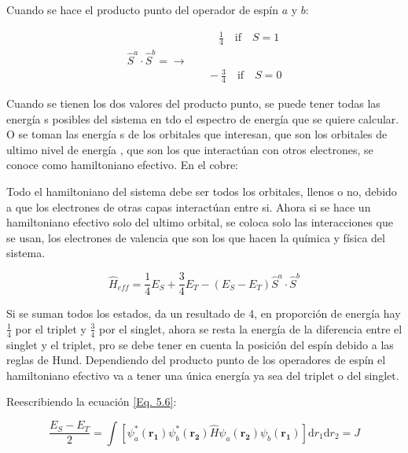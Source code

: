 \documentclass[11pt,fleqn]{book}
\renewcommand{\vec}[1]{\mathbf{#1}}
\begin{document}
Cuando se hace el producto punto del operador de espín $a$ y $b$:

\begin{equation*}
\begin{split}
    &\qquad\frac{1}{4}\quad\text{if}\quad S=1\\
    \hat{S}^{a}\cdot\hat{S}^{b}=\longrightarrow&\\
    &\quad-\frac{3}{4}\quad\text{if}\quad S=0
\end{split}
\end{equation*}

Cuando se tienen los dos valores del producto punto, se puede tener todas las energía s posibles del sistema en tdo el espectro de energía  que se quiere calcular. O se toman las energía s de los orbitales que interesan, que son los orbitales de ultimo nivel de energía , que son los que interactúan con otros electrones, se conoce como hamiltoniano efectivo. En el cobre:


Todo el hamiltoniano del sistema debe ser todos los orbitales, llenos o no, debido a que los electrones de otras capas interactúan entre si. Ahora si se hace un hamiltoniano efectivo solo del ultimo orbital, se coloca solo las interacciones que se usan, los electrones de valencia que son los que hacen la química y física del sistema. 

\begin{equation}
    \hat{H}_{eff}=\frac{1}{4}E_{S}+\frac{3}{4}E_{T}-(E_{S}-E_{T})\hat{S}^{a}\cdot\hat{S}^{b}
    \label{Eq. 5.7}
\end{equation}

Si se suman todos los estados, da un resultado de 4, en proporción de energía  hay $\frac{1}{4}$ por el triplet y $\frac{3}{4}$ por el singlet, ahora se resta la energía de la diferencia entre el singlet y el triplet, pro se debe tener en cuenta la posición del espín debido a las reglas de Hund. Dependiendo del producto punto de los operadores de espín el hamiltoniano efectivo va a tener una única energía  ya sea del triplet o del singlet.

Reescribiendo la ecuación \ref{Eq. 5.6}:

\begin{equation}
    \frac{E_{S}-E_{T}}{2}=\int\left[\psi_{a}^{\ast}(\vec{r_{1}})\psi_{b}^{\ast}(\vec{r_{2}})\hat{H}\psi_{a}(\vec{r_{2}})\psi_{b}(\vec{r_{1}})\right]\mathrm{d}r_{1}\mathrm{d}r_{2}=J
    \label{Eq. 5.8}
\end{equation}
\end{document}
